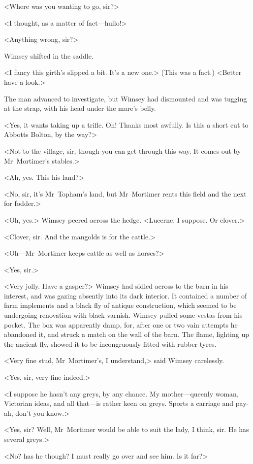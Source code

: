 <Where was you wanting to go, sir?>

<I thought, as a matter of fact—hullo!>

<Anything wrong, sir?>

Wimsey shifted in the saddle.

<I fancy this girth's slipped a bit. It's a new one.> (This was a fact.) <Better have a look.>

The man advanced to investigate, but Wimsey had dismounted and was tugging at the strap, with his head under the mare's belly.

<Yes, it wants taking up a trifle. Oh! Thanks most awfully. Is this a short cut to Abbotts Bolton, by the way?>

<Not to the village, sir, though you can get through this way. It comes out by Mr~Mortimer's stables.>

<Ah, yes. This his land?>

<No, sir, it's Mr~Topham's land, but Mr~Mortimer rents this field and the next for fodder.>

<Oh, yes.> Wimsey peered across the hedge. <Lucerne, I suppose. Or clover.>

<Clover, sir. And the mangolds is for the cattle.>

<Oh—Mr~Mortimer keeps cattle as well as horses?>

<Yes, sir.>

<Very jolly. Have a gasper?> Wimsey had sidled across to the barn in his interest, and was gazing absently into its dark interior. It contained a number of farm implements and a black fly of antique construction, which seemed to be undergoing renovation with black varnish. Wimsey pulled some vestas from his pocket. The box was apparently damp, for, after one or two vain attempts he abandoned it, and struck a match on the wall of the barn. The flame, lighting up the ancient fly, showed it to be incongruously fitted with rubber tyres.

<Very fine stud, Mr~Mortimer's, I understand,> said Wimsey carelessly.

<Yes, sir, very fine indeed.>

<I suppose he hasn't any greys, by any chance. My mother—queenly woman, Victorian ideas, and all that—is rather keen on greys. Sports a carriage and pay-ah, don't you know.>

<Yes, sir? Well, Mr~Mortimer would be able to suit the lady, I think, sir. He has several greys.>

<No? has he though? I must really go over and see him. Is it far?>

